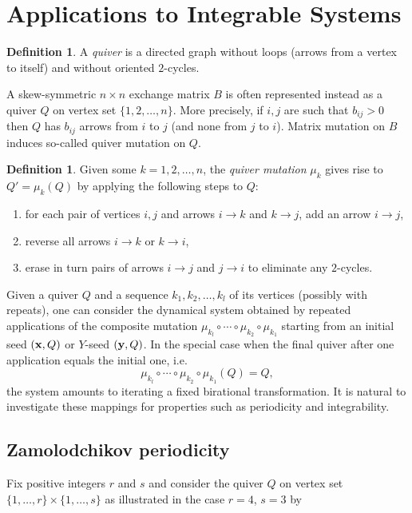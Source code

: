 \documentclass{amsart}
\theoremstyle{definition}
\newtheorem{definition}[theorem]{Definition}
\theoremstyle{remark}
\numberwithin{equation}{section}
\newcommand{\x}{{\bf x}}
\newcommand{\y}{{\bf y}}
\begin{document}
\section{Applications to Integrable Systems}\label{sec:integrable_systems}
	\begin{definition}
		A \emph{quiver} is a directed graph without loops (arrows from a vertex to itself) and without oriented $2$-cycles.
	\end{definition}
	
	A skew-symmetric $n\times n$ exchange matrix $B$ is often represented instead as a quiver $Q$ on vertex set $\{1,2,\ldots, n\}$.  More precisely, if $i,j$ are such that $b_{ij}>0$ then $Q$ has $b_{ij}$ arrows from $i$ to $j$ (and none from $j$ to $i$).  Matrix mutation on $B$ induces so-called quiver mutation on $Q$.
	
	\begin{definition}
		Given some $k=1,2,\ldots, n$, the \emph{quiver mutation} $\mu_k$ gives rise to $Q' = \mu_k(Q)$ by applying the following steps to $Q$:
		\begin{enumerate}
		\item for each pair of vertices $i,j$ and arrows $i\to k$ and $k \to j$, add an arrow $i \to j$,
		\item reverse all arrows $i \to k$ or $k \to i$,
		\item erase in turn pairs of arrows $i \to j$ and $j \to i$ to eliminate any $2$-cycles.
		\end{enumerate}
	\end{definition}
	
	Given a quiver $Q$ and a sequence $k_1,k_2,\ldots, k_l$ of its vertices (possibly with repeats), one can consider the dynamical system obtained by repeated applications of the composite mutation $\mu_{k_l} \circ \cdots \circ \mu_{k_2} \circ \mu_{k_1}$ starting from an initial seed $(\x, Q)$ or $Y$-seed $(\y,Q)$.  In the special case when the final quiver after one application equals the initial one, i.e.
	\begin{displaymath}
		\mu_{k_l} \circ \cdots \circ \mu_{k_2} \circ \mu_{k_1}(Q) = Q,
	\end{displaymath}
	the system amounts to iterating a fixed birational transformation.  It is natural to investigate these mappings for properties such as periodicity and integrability.

\subsection{Zamolodchikov periodicity}
	Fix positive integers $r$ and $s$ and consider the quiver $Q$ on vertex set $\{1,\ldots, r \} \times \{1,\ldots, s\}$ as illustrated in the case $r=4$, $s=3$ by
	
\end{document}
